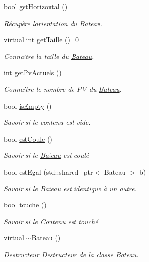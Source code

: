 \begin{DoxyCompactItemize}
bool \hyperlink{class_bateau_a8578b6073e4f546d4c255e23fbb3c1dc}{get\+Horizontal} ()
\begin{DoxyCompactList}\small\item\em Récupère l\textquotesingle{}orientation du \hyperlink{class_bateau}{Bateau}. \end{DoxyCompactList}\item 
virtual int \hyperlink{class_bateau_a08be20b8c871149d717a30b00c1068b9}{get\+Taille} ()=0
\begin{DoxyCompactList}\small\item\em Connaitre la taille du \hyperlink{class_bateau}{Bateau}. \end{DoxyCompactList}\item 
int \hyperlink{class_bateau_afe0dcf17979772fef6973b5aa5bca46a}{get\+Pv\+Actuels} ()
\begin{DoxyCompactList}\small\item\em Connaitre le nombre de PV du \hyperlink{class_bateau}{Bateau}. \end{DoxyCompactList}\item 
bool \hyperlink{class_bateau_a8a8984f7b1010fbdd4cd15c7768da2ca}{is\+Empty} ()
\begin{DoxyCompactList}\small\item\em Savoir si le contenu est vide. \end{DoxyCompactList}\item 
bool \hyperlink{class_bateau_a6e4d8fc7cf8b265592dd009ecac72be2}{est\+Coule} ()
\begin{DoxyCompactList}\small\item\em Savoir si le \hyperlink{class_bateau}{Bateau} est coulé \end{DoxyCompactList}\item 
bool \hyperlink{class_bateau_a0eaa5c908df108398064be6a8ab20a60}{est\+Egal} (std\+::shared\+\_\+ptr$<$ \hyperlink{class_bateau}{Bateau} $>$ b)
\begin{DoxyCompactList}\small\item\em Savoir si le \hyperlink{class_bateau}{Bateau} est identique à un autre. \end{DoxyCompactList}\item 
bool \hyperlink{class_bateau_a8fff831d5081544b0abbf5b6816ebe35}{touche} ()
\begin{DoxyCompactList}\small\item\em Savoir si le \hyperlink{class_contenu}{Contenu} est touché \end{DoxyCompactList}\item 
virtual \hyperlink{class_bateau_a8545a0456e618328674c5cdf629e14b5}{$\sim$\+Bateau} ()\hypertarget{class_bateau_a8545a0456e618328674c5cdf629e14b5}{}\label{class_bateau_a8545a0456e618328674c5cdf629e14b5}

\begin{DoxyCompactList}\small\item\em Destructeur Destructeur de la classe \hyperlink{class_bateau}{Bateau}. \end{DoxyCompactList}\end{DoxyCompactItemize}
